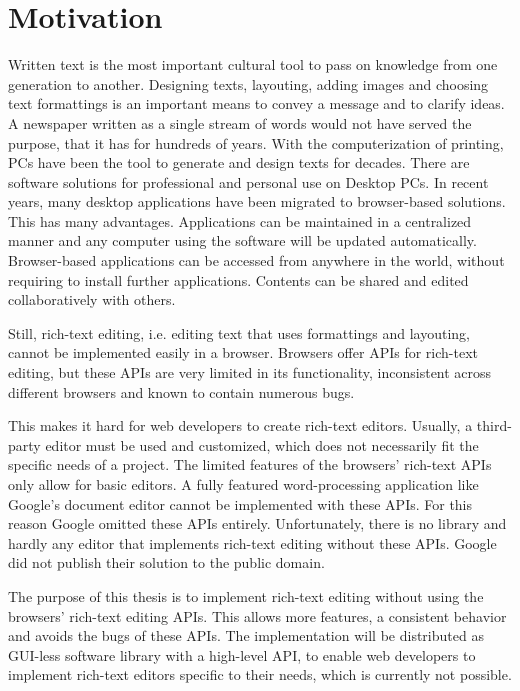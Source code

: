 \section{Motivation}

Written text is the most important cultural tool to pass on knowledge from one generation to another. Designing texts, layouting, adding images and choosing text formattings is an important means to convey a message and to clarify ideas. A newspaper written as a single stream of words would not have served the purpose, that it has for hundreds of years.
With the computerization of printing, PCs have been the tool to generate and design texts for decades. There are software solutions for professional and personal use on Desktop PCs.
In recent years, many desktop applications have been migrated to browser-based solutions. This has many advantages. Applications can be maintained in a centralized manner and any computer using the software will be updated automatically. Browser-based applications can be accessed from anywhere in the world, without requiring to install further applications. Contents can be shared and edited collaboratively with others.

Still, rich-text editing, i.e. editing text that uses formattings and layouting, cannot be implemented easily in a browser. Browsers offer APIs for rich-text editing, but these APIs are very limited in its functionality, inconsistent across different browsers and known to contain numerous bugs.

This makes it hard for web developers to create rich-text editors. Usually, a third-party editor must be used and customized, which does not necessarily fit the specific needs of a project. The limited features of the browsers' rich-text APIs only allow for basic editors. A fully featured word-processing application like Google's document editor cannot be implemented with these APIs. For this reason Google omitted these APIs entirely. Unfortunately, there is no library and hardly any editor that implements rich-text editing without these APIs. Google did not publish their solution to the public domain.

The purpose of this thesis is to implement rich-text editing without using the browsers' rich-text editing APIs. This allows more features, a consistent behavior and avoids the bugs of these APIs. The implementation will be distributed as GUI-less software library with a high-level API, to enable web developers to implement rich-text editors specific to their needs, which is currently not possible.


